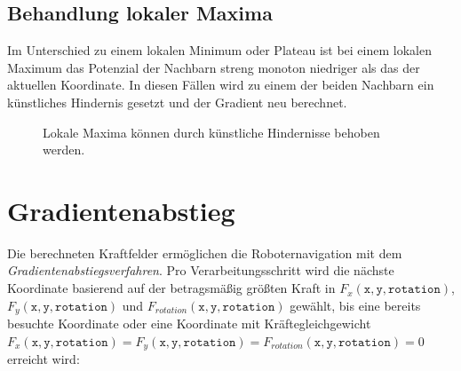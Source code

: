 \subsection{Behandlung lokaler Maxima}

Im Unterschied zu einem lokalen Minimum oder Plateau ist bei einem lokalen Maximum das Potenzial der Nachbarn streng monoton niedriger als das der aktuellen Koordinate.
In diesen Fällen wird zu einem der beiden Nachbarn ein künstliches Hindernis gesetzt und der Gradient neu berechnet.
\begin{figure}[H]
	\centering
	\footnotesize
	\centerline{\resizebox{0.9\linewidth}{!}{}}
	\caption{Lokale Maxima können durch künstliche Hindernisse behoben werden.}
\end{figure}


\section{Gradientenabstieg}

Die berechneten Kraftfelder ermöglichen die Roboternavigation mit dem \textit{Gradientenabstiegsverfahren}. Pro Verarbeitungsschritt wird die nächste Koordinate basierend auf der betragsmäßig größten Kraft in $F_{x}(\texttt{x}, \texttt{y}, \texttt{rotation})$, $F_{y}(\texttt{x}, \texttt{y}, \texttt{rotation})$ und $F_{rotation}(\texttt{x}, \texttt{y}, \texttt{rotation})$ gewählt, bis eine bereits besuchte Koordinate oder eine Koordinate mit Kräftegleichgewicht $F_{x}(\texttt{x}, \texttt{y}, \texttt{rotation}) = F_{y}(\texttt{x}, \texttt{y}, \texttt{rotation}) = F_{rotation}(\texttt{x}, \texttt{y}, \texttt{rotation}) = 0$ erreicht wird:

